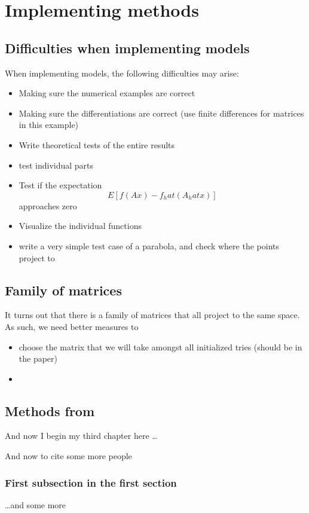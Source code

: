 \chapter{Implementing methods}

\ifpdf
    \graphicspath{{Chapter3/Figs/Raster/}{Chapter3/Figs/PDF/}{Chapter3/Figs/}}
\else
    \graphicspath{{Chapter3/Figs/Vector/}{Chapter3/Figs/}}
\fi

\section{Difficulties when implementing models}
When implementing models, the following difficulties may arise:

\begin{itemize}
\item Making sure the numerical examples are correct
\item Making sure the differentiations are correct (use finite differences for matrices in this example)
\item Write theoretical tests of the entire results
\item test individual parts
\item Test if the expectation $$ E[ f(A x) - f_hat(A_hat x) ] $$ approaches zero
\item Visualize the individual functions
\item write a very simple test case of a parabola, and check where the points project to
\end{itemize}

\section{Family of matrices}
It turns out that there is a family of matrices that all project to the same space.
As such, we need better measures to 
\begin{itemize}
\item choose the matrix that we will take amongst all initialized tries (should be in the paper)
\item 
\end{itemize}

\section{Methods from }
And now I begin my third chapter here \dots

And now to cite some more people~\citet{Rea85,Ancey1996}

\subsection{First subsection in the first section}
\dots and some more 



